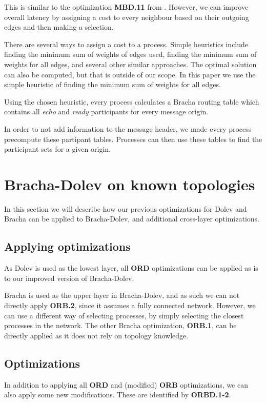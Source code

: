 This is similar to the optimization \textbf{MBD.11} from \cite{bonomi2021practical}. However, we can improve overall latency by assigning a cost to every neighbour based on their outgoing edges and then making a selection. 

There are several ways to assign a cost to a process. Simple heuristics include finding the minimum sum of weights of edges used, finding the minimum sum of weights for all edges, and several other similar approaches. The optimal solution can also be computed, but that is outside of our scope. In this paper we use the simple heuristic of finding the minimum sum of weights for all edges.

Using the chosen heuristic, every process calculates a Bracha routing table which contains all \textit{echo} and \textit{ready} participants for every message origin.

In order to not add information to the message header, we made every process precompute these partipant tables. Processes can then use these tables to find the participant sets for a given origin.


\section{Bracha-Dolev on known topologies}
\label{contr-bracha-dolev}
In this section we will describe how our previous optimizations for Dolev and Bracha can be applied to Bracha-Dolev, and additional cross-layer optimizations.

\subsection{Applying optimizations}
As Dolev is used as the lowest layer, all \textbf{ORD} optimizations can be applied as is to our improved version of Bracha-Dolev.

Bracha is used as the upper layer in Bracha-Dolev, and as such we can not directly apply \textbf{ORB.2}, since it assumes a fully connected network. However, we can use a different way of selecting processes, by simply selecting the closest processes in the network.
The other Bracha optimization, \textbf{ORB.1}, can be directly applied as it does not rely on topology knowledge.

\subsection{Optimizations}
In addition to applying all \textbf{ORD} and (modified) \textbf{ORB} optimizations, we can also apply some new modifications. These are identified by \textbf{ORBD.1-2}.


